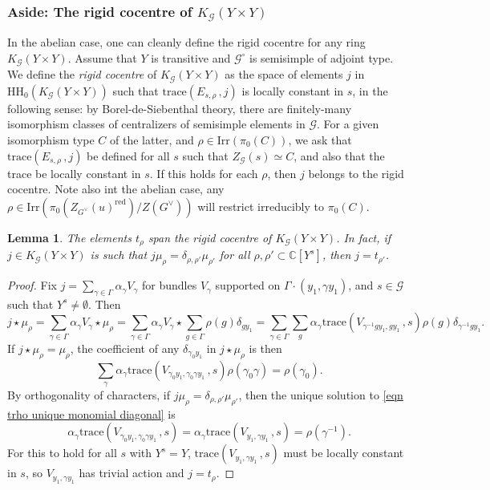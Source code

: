 \documentclass[10pt]{article}
\newcommand{\Gg}{\mathcal{G}}
\newcommand{\trace}[2]{\mathrm{trace}\left({#1}\,,{#2}\right)}
\newcommand{\C}{\mathbb{C}}
\newtheorem{lem}{Lemma}
\theoremstyle{definition}
\theoremstyle{remark}
\newcommand{\hhh}{\mathrm{HH}_0}
\newcommand{\Zur}{Z_{G^\vee}(u)^{\mathrm{red}}}
\newcommand{\Zz}{\mathcal{G}}
\begin{document}
\subsubsection{Aside: The rigid cocentre of $K_\Zz(Y\times Y)$}
In the abelian case, one can cleanly define the rigid cocentre for any ring $K_\Zz(Y\times Y)$.
Assume that $Y$ is transitive and $\Zz^\circ$ is semisimple of adjoint type. We define the \emph{rigid cocentre} of $K_{\Zz}(Y\times Y)$ as the space of elements $j$ in 
$\hhh\left(K_{\Zz}(Y\times Y)\right)$ such that $\trace{E_{s,\rho}}{j}$ is locally constant in $s$, in the 
following sense: by Borel-de-Siebenthal theory, there are finitely-many isomorphism classes of 
centralizers of semisimple elements in $\Zz$. For a given isomorphism type $C$ of the latter, and 
$\rho\in\mathrm{Irr}(\pi_0(C))$, 
we ask that $\trace{E_{s,\rho}}{j}$ be defined for all $s$ such that $Z_{\Zz}(s)\simeq C$,
and also that the trace be locally constant in $s$. If this holds for each $\rho$, then 
$j$ belongs to the rigid cocentre. Note also int the abelian case, any $\rho\in\mathrm{Irr}(\pi_0(\Zur)/Z(G^\vee))$ will restrict irreducibly to $\pi_0(C)$.
%
\begin{lem}
\label{lem trho span rigid cocentre of K-theory}
The elements $t_\rho$ span the rigid cocentre of $K_{\Zz}(Y\times Y)$. In fact, if 
$j\in K_{\Zz}(Y\times Y)$ is such that $j\mu_\rho=\delta_{\rho,\rho'}\mu_{\rho'}$
for all $\rho,\rho'\subset\C[Y^s]$, then $j=t_{\rho'}$.
\end{lem}
%
\begin{proof}
Fix $j=\sum_{\gamma\in\Gamma}\alpha_\gamma V_\gamma$ for bundles $V_\gamma$ supported on 
$\Gamma\cdot (y_1,\gamma y_1)$, and $s\in \Gg$ such that $Y^s\neq\emptyset$. Then 
%
\[
j\star\mu_\rho =
\sum_{\gamma\in\Gamma}\alpha_\gamma V_\gamma\star\mu_\rho
=
\sum_{\gamma\in\Gamma}\alpha_\gamma V_\gamma\star\sum_{g\in\Gamma}\rho(g)\delta_{g y_1}
=
\sum_{\gamma\in\Gamma}\sum_{g}\alpha_\gamma\trace{V_{\gamma^{-1}gy_1,gy_1}}{s}\rho(g)\delta_{\gamma^{-1}g y_1}.
\]
%
If $j\star\mu_{\rho}=\mu_\rho$, the coefficient of any $\delta_{\gamma_0y_1}$ in $j\star\mu_\rho$ is 
then
%
\begin{equation}
\label{eqn trho unique monomial diagonal}
\sum_{\gamma}\alpha_\gamma\trace{V_{\gamma_0 y_1,\gamma_0\gamma y_1}}{s}\rho(\gamma_0\gamma)=\rho(\gamma_0).
\end{equation}
%
By orthogonality of characters, if $j\mu_\rho=\delta_{\rho,\rho'}\mu_{\rho'}$, then the unique solution
to \eqref{eqn trho unique monomial diagonal} is 
%
\[
\alpha_\gamma\trace{V_{\gamma_0 y_1,\gamma_0\gamma y_1}}{s}=
\alpha_\gamma\trace{V_{y_1,\gamma y_1}}{s}=
\rho(\gamma^{-1}).
\]
%
For this to hold for all $s$ with $Y^s=Y$, $\trace{V_{y_1,\gamma y_1}}{s}$ must be locally constant in 
$s$, so $V_{y_1,\gamma y_1}$ has trivial action and $j=t_\rho$.
%
\end{proof}
\end{document}
